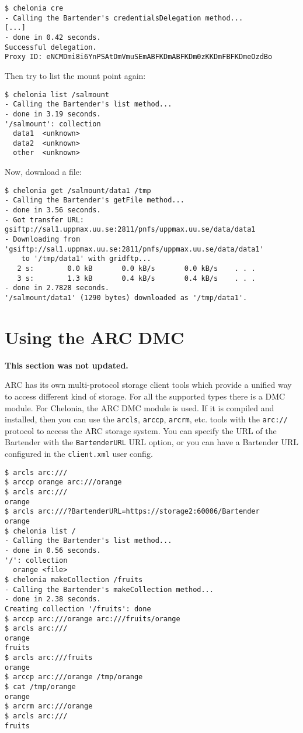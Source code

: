 \documentclass{article}
\begin{document}
\begin{verbatim}
$ chelonia cre
- Calling the Bartender's credentialsDelegation method...
[...]
- done in 0.42 seconds.
Successful delegation.
Proxy ID: eNCMDmi8i6YnPSAtDmVmuSEmABFKDmABFKDm0zKKDmFBFKDmeOzdBo
\end{verbatim}

Then try to list the mount point again:

\begin{verbatim}
$ chelonia list /salmount
- Calling the Bartender's list method...
- done in 3.19 seconds.
'/salmount': collection
  data1  <unknown>
  data2  <unknown>
  other  <unknown>
\end{verbatim}

Now, download a file:

\begin{verbatim}
$ chelonia get /salmount/data1 /tmp
- Calling the Bartender's getFile method...
- done in 3.56 seconds.
- Got transfer URL: gsiftp://sal1.uppmax.uu.se:2811/pnfs/uppmax.uu.se/data/data1
- Downloading from 'gsiftp://sal1.uppmax.uu.se:2811/pnfs/uppmax.uu.se/data/data1'
    to '/tmp/data1' with gridftp...
   2 s:        0.0 kB       0.0 kB/s       0.0 kB/s    . . .       
   3 s:        1.3 kB       0.4 kB/s       0.4 kB/s    . . .       
- done in 2.7828 seconds.
'/salmount/data1' (1290 bytes) downloaded as '/tmp/data1'.
\end{verbatim}

\section{Using the ARC DMC} %
\label{sec:using_the_arc_dmc}

\textbf{This section was not updated.}

ARC has its own multi-protocol storage client tools which provide a unified way to access different kind of storage. For all the supported types there is a DMC module. For Chelonia, the ARC DMC module is used. If it is compiled and installed, then you can use the \verb!arcls!, \verb!arccp!, \verb!arcrm!, etc. tools with the \verb!arc://! protocol to access the ARC storage system. You can specify the URL of the Bartender with the \verb!BartenderURL! URL option, or you can have a Bartender URL configured in the \verb!client.xml! user config.

\begin{verbatim}
$ arcls arc:///
$ arccp orange arc:///orange
$ arcls arc:///
orange
$ arcls arc:///?BartenderURL=https://storage2:60006/Bartender
orange
$ chelonia list /
- Calling the Bartender's list method...
- done in 0.56 seconds.
'/': collection
  orange <file>
$ chelonia makeCollection /fruits
- Calling the Bartender's makeCollection method...
- done in 2.38 seconds.
Creating collection '/fruits': done
$ arccp arc:///orange arc:///fruits/orange
$ arcls arc:///
orange
fruits
$ arcls arc:///fruits
orange
$ arccp arc:///orange /tmp/orange
$ cat /tmp/orange 
orange
$ arcrm arc:///orange
$ arcls arc:///
fruits
\end{verbatim}
\end{document}
